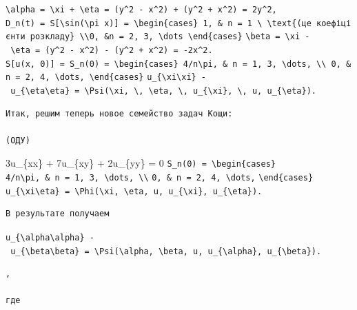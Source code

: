 \documentclass[
  ukrainian,
]{article}
\begin{document}
\texttt{\textbackslash{}alpha\ =\ \textbackslash{}xi\ +\ \textbackslash{}eta\ =\ (y\^{}2\ -\ x\^{}2)\ +\ (y\^{}2\ +\ x\^{}2)\ =\ 2y\^{}2,}
\texttt{D\_n(t)\ =\ S{[}\textbackslash{}sin(\textbackslash{}pi\ x){]}\ =\ \textbackslash{}begin\{cases\}\ 1,\ \&\ n\ =\ 1\ \textbackslash{}\ \textbackslash{}text\{(це\ коефіцієнти\ розкладу\}\ \textbackslash{}\textbackslash{}0,\ \&n\ =\ 2,\ 3,\ \textbackslash{}dots\ \textbackslash{}end\{cases\}}
\texttt{\textbackslash{}beta\ =\ \textbackslash{}xi\ -\ \textbackslash{}eta\ =\ (y\^{}2\ -\ x\^{}2)\ -\ (y\^{}2\ +\ x\^{}2)\ =\ -2x\^{}2.}
\texttt{S{[}u(x,\ 0){]}\ =\ S\_n(0)\ =\ \textbackslash{}begin\{cases\}\ 4/n\textbackslash{}pi,\ \&\ n\ =\ 1,\ 3,\ \textbackslash{}dots,\ \textbackslash{}\textbackslash{}\ 0,\ \&n\ =\ 2,\ 4,\ \textbackslash{}dots,\ \textbackslash{}end\{cases\}}
\texttt{u\_\{\textbackslash{}xi\textbackslash{}xi\}\ -\ u\_\{\textbackslash{}eta\textbackslash{}eta\}\ =\ \textbackslash{}Psi(\textbackslash{}xi,\ \textbackslash{},\ \textbackslash{}eta,\ \textbackslash{},\ u\_\{\textbackslash{}xi\},\ \textbackslash{},\ u,\ u\_\{\textbackslash{}eta\}).}

\begin{verbatim}
Итак, решим теперь новое семейство задач Кощи:

(ОДУ)
\end{verbatim}

3u\_\{xx\} + 7u\_\{xy\} + 2u\_\{yy\} = 0
\texttt{S\_n(0)\ =\ \textbackslash{}begin\{cases\}}
\texttt{4/n\textbackslash{}pi,\ \&\ n\ =\ 1,\ 3,\ \textbackslash{}dots,\ \textbackslash{}\textbackslash{}}
\texttt{0,\ \&\ n\ =\ 2,\ 4,\ \textbackslash{}dots,}
\texttt{\textbackslash{}end\{cases\}}
\texttt{u\_\{\textbackslash{}xi\textbackslash{}eta\}\ =\ \textbackslash{}Phi(\textbackslash{}xi,\ \textbackslash{}eta,\ u,\ u\_\{\textbackslash{}xi\},\ u\_\{\textbackslash{}eta\}).}

\begin{verbatim}
В результате получаем
\end{verbatim}

\texttt{u\_\{\textbackslash{}alpha\textbackslash{}alpha\}\ -\ u\_\{\textbackslash{}beta\textbackslash{}beta\}\ =\ \textbackslash{}Psi(\textbackslash{}alpha,\ \textbackslash{}beta,\ u,\ u\_\{\textbackslash{}alpha\},\ u\_\{\textbackslash{}beta\}).}

\begin{verbatim}
,

где
\end{verbatim}
\end{document}
